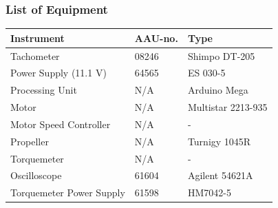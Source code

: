 \subsubsection{List of Equipment}
\begin{table}[H]
	\begin{tabular}{|l|l|p{4.3cm}|}
		\hline%
		\textbf{Instrument}                                  &  \textbf{AAU-no.}  &  \textbf{Type}                       \\
		\hline%
		Tachometer                                           &  08246           &  Shimpo DT-205		                   \\
		\hline%
	    Power Supply (11.1 V) &  64565                   &  ES 030-5                 \\
		\hline%
		Processing Unit                                   &  N/A               & Arduino Mega     \\
		\hline%
		Motor                                   &  N/A               & Multistar 2213-935     \\
		\hline%
		Motor Speed Controller                                   &  N/A               &  -      \\
		\hline%
		Propeller                                   &  N/A               & Turnigy 1045R     \\
		\hline%
		Torquemeter                                   &  N/A               & -     \\
		\hline%
		Oscilloscope                                   & 61604               & Agilent 54621A     \\
		\hline%
		Torquemeter Power Supply                   &  61598              & HM7042-5    \\
		\hline%
		
	\end{tabular}
\end{table}

